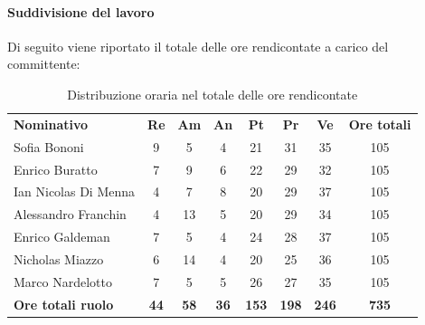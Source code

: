 \documentclass[../piano-di-progetto.tex]{subfiles}
\begin{document}
    \paragraph{Suddivisione del lavoro}
    Di seguito viene riportato il totale delle ore rendicontate a carico del committente:
    \begin{table}[H]
      \centering
      \begin{tabular}{lccccccc}
        \rowcolor{lightgray}
        \textbf{Nominativo}       & \textbf{Re} & \textbf{Am} & \textbf{An} & \textbf{Pt}  & \textbf{Pr}  & \textbf{Ve}  & \textbf{Ore totali} \\
Sofia Bononi              & 9           & 5           & 4           & 21           & 31           & 35           & 105                 \\
Enrico Buratto            & 7           & 9           & 6           & 22           & 29           & 32           & 105                 \\
Ian Nicolas Di Menna      & 4           & 7           & 8           & 20           & 29           & 37           & 105                 \\
Alessandro Franchin       & 4           & 13          & 5           & 20           & 29           & 34           & 105                 \\
Enrico Galdeman           & 7           & 5           & 4           & 24           & 28           & 37           & 105                 \\
Nicholas Miazzo           & 6           & 14          & 4           & 20           & 25           & 36           & 105                 \\
Marco Nardelotto          & 7           & 5           & 5           & 26           & 27           & 35           & 105                 \\
\textbf{Ore totali ruolo} & \textbf{44} & \textbf{58} & \textbf{36} & \textbf{153} & \textbf{198} & \textbf{246} & \textbf{735}       

      \end{tabular}
      \caption{Distribuzione oraria nel totale delle ore rendicontate}
      \end{table}
  
\end{document}
